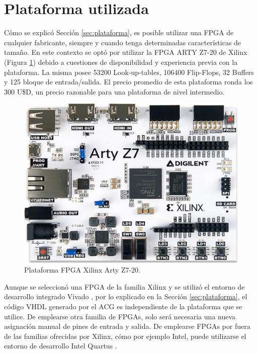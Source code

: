 \section{Plataforma utilizada}
	\label{sec:ARTY}
	
	Cómo se explicó Sección \ref{sec:plataforma}, es posible utilizar una FPGA de cualquier fabricante, siempre y cuando tenga determinadas características de tamaño. En este contexto se optó por utilizar la FPGA ARTY Z7-20 de Xilinx (Figura \ref{fig:FPGA}) debido a cuestiones de disponibilidad y experiencia previa con la plataforma. La misma posee 53200 Look-up-tables, 106400 Flip-Flops, 32 Buffers y 125 bloque de entrada/salida. El precio promedio de esta plataforma ronda los 300 U\$D, un precio razonable para una plataforma de nivel intermedio.	
	
	\begin{figure}[H]
		\centering
		\includegraphics[width=1\textwidth]{Figuras/FPGA}
		\centering\caption{Plataforma FPGA Xilinx Arty Z7-20.}
		\label{fig:FPGA}
	\end{figure}
	
	Aunque se seleccionó una FPGA de la familia Xilinx \cite{Paper_30,Paper_36,Paper_37,Paper_40,Paper_41,Paper_47,Paper_97,Paper_104,Paper_106} y se utilizó el entorno de desarrollo integrado Vivado \cite{VIVADO,Paper_111}, por lo explicado en la Sección \ref{sec:plataforma}, el código VHDL generado por el ACG es independiente de la plataforma que se utilice. De emplearse otra familia de FPGAs, solo será necesaria una nueva asignación manual de pines de entrada y salida. De emplearse FPGAs por fuera de las familias ofrecidas por Xilinx, cómo por ejemplo Intel, puede utilizarse el entorno de desarrollo Intel Quartus \cite{QUARTUS}.
	
